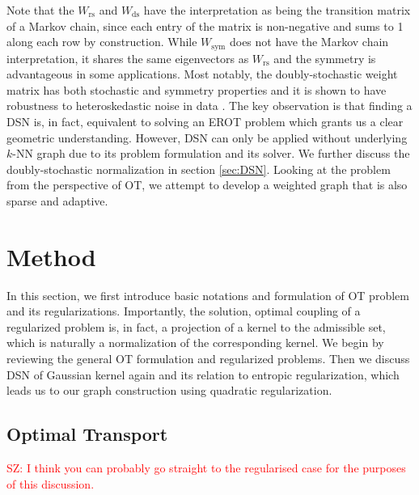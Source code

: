 \documentclass{article}
\newcommand{\R}{\mathbb{R}}
\newcommand{\red}[1]{\textcolor{red}{#1}}
\newcommand{\diff}{\mathrm{d}}
\begin{document}
Note that the $W_{\text{rs}}$ and $W_{\text{ds}}$ have the interpretation as being the transition matrix of a Markov chain, since each entry of the matrix is non-negative and sums to 1 along each row by construction.
While $W_{\text{sym}}$ does not have the Markov chain interpretation, it shares the same eigenvectors as $W_{\text{rs}}$ and the symmetry is advantageous in some applications.
Most notably, the doubly-stochastic weight matrix has both stochastic and symmetry properties and it is shown to have robustness to heteroskedastic noise in data \cite{landa2021doubly}.
The key observation is that finding a DSN is, in fact, equivalent to solving an EROT problem which grants us a clear geometric understanding.
However, DSN can only be applied without underlying $k$-NN graph due to its problem formulation and its solver.
We further discuss the doubly-stochastic normalization in section \ref{sec:DSN}.
Looking at the problem from the perspective of OT, we attempt to develop a weighted graph that is also sparse and adaptive.






\section{Method}\label{sec:Method}

In this section, we first introduce basic notations and formulation of OT problem and its regularizations. Importantly, the solution, optimal coupling of a regularized problem is, in fact, a projection of a kernel to the admissible set, which is naturally a normalization of the corresponding kernel. We begin by reviewing the general OT formulation and regularized problems. Then we discuss DSN of Gaussian kernel again and its relation to entropic regularization, which leads us to our graph construction using quadratic regularization.

\subsection{Optimal Transport}\label{sec:OT}
\red{SZ: I think you can probably go straight to the regularised case for the purposes of this discussion.}
\end{document}
